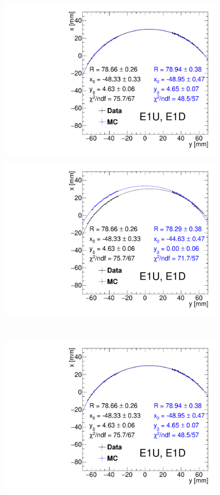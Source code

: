 \begin{figure}[hb]
{  \includegraphics[width=\linewidth,page=3]{graphics/rpSim/Apertures_swapedAxes_withFit.pdf}
}%
\end{figure}
\begin{figure}[ht!]\ContinuedFloat
\centering
\parbox{0.495\textwidth}{
  \centering
  \includegraphics[width=\linewidth,page=4]{graphics/rpSim/Apertures_swapedAxes_withFit_beforeDxShift.pdf}
}~
\parbox{0.495\textwidth}{
  \centering
  \includegraphics[width=\linewidth,page=4]{graphics/rpSim/Apertures_swapedAxes_withFit.pdf}
}%
\end{figure}
